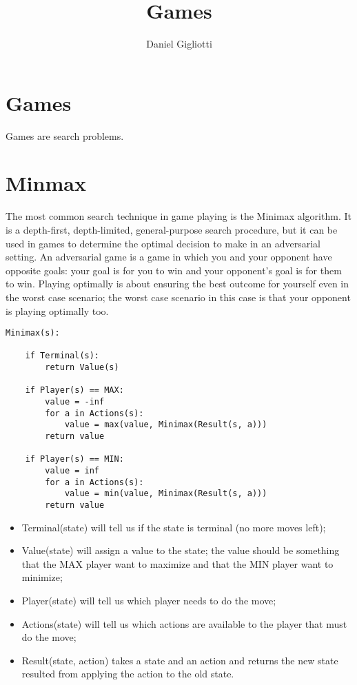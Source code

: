 \documentclass{article}
\title{Games}
\author{Daniel Gigliotti}
\date{}
\begin{document}
\maketitle

\section{Games}

Games are search problems.

\section*{Minmax}

The most common search technique in game playing is the Minimax algorithm. 
It is a depth-first, depth-limited, general-purpose search procedure, but it can be used in games to determine the optimal decision to make in an adversarial setting. An adversarial game is a game in which you and your opponent have opposite goals: your goal is for you to win and your opponent's goal is for them to win. Playing optimally is about ensuring the best outcome for yourself even in the worst case scenario; the worst case scenario in this case is that your opponent is playing optimally too.

\newpage

\begin{lstlisting}
Minimax(s):

    if Terminal(s):
        return Value(s)

    if Player(s) == MAX:
        value = -inf
        for a in Actions(s):
            value = max(value, Minimax(Result(s, a)))
        return value

    if Player(s) == MIN:
        value = inf
        for a in Actions(s):
            value = min(value, Minimax(Result(s, a)))
        return value 
\end{lstlisting}

\begin{itemize}
    \item Terminal(state) will tell us if the state is terminal (no more moves left);
    \item Value(state) will assign a value to the state; the value should be something that the MAX player want to maximize and that the MIN player want to minimize;
    \item Player(state) will tell us which player needs to do the move;
    \item Actions(state) will tell us which actions are available to the player that must do the move;
    \item Result(state, action) takes a state and an action and returns the new state resulted from applying the action to the old state. 
\end{itemize}
\end{document}
